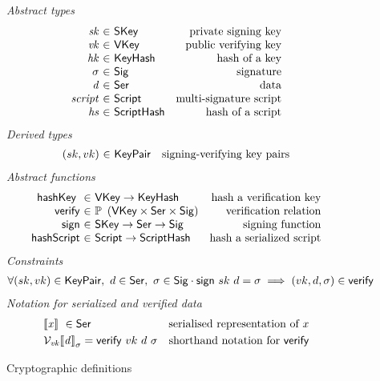 \begin{figure}[htb]
  \emph{Abstract types}
  \begin{equation*}
    \begin{array}{r@{~\in~}lr}
      \var{sk} & \SKey & \text{private signing key}\\
      \var{vk} & \VKey & \text{public verifying key}\\
      \var{hk} & \KeyHash & \text{hash of a key}\\
      \sigma & \Sig  & \text{signature}\\
      \var{d} & \Ser  & \text{data}\\
      \var{script} & \Script & \text{multi-signature script} \\
      \var{hs} & \HashScr & \text{hash of a script}
    \end{array}
  \end{equation*}
  \emph{Derived types}
  \begin{equation*}
    \begin{array}{r@{~\in~}lr}
      (sk, vk) & \KeyPair & \text{signing-verifying key pairs}
    \end{array}
  \end{equation*}
  \emph{Abstract functions}
  \begin{equation*}
    \begin{array}{r@{~\in~}lr}
      \hashKey{} & \VKey \to \KeyHash
                 & \text{hash a verification key} \\
      \fun{verify} & \powerset{\left(\VKey \times \Ser \times \Sig\right)}
                   & \text{verification relation}\\
      \fun{sign} & \SKey \to \Ser \to \Sig
                 & \text{signing function}\\
      \fun{hashScript} & \Script \to \HashScr & \text{hash a serialized script}
    \end{array}
  \end{equation*}
  \emph{Constraints}
  \begin{align*}
    & \forall (sk, vk) \in \mathsf{KeyPair},~ d \in \mathsf{Ser},~ \sigma \in \mathsf{Sig} \cdot
    \mathsf{sign} ~ sk ~ d = \sigma \implies (vk, d, \sigma) \in \mathsf{verify}
  \end{align*}
  \emph{Notation for serialized and verified data}
  \begin{align*}
    & \llbracket \mathit{x} \rrbracket ~\in \mathsf{Ser} & \text{serialised representation of } x\\
    & \mathcal{V}_{\mathit{vk}}{\llbracket \mathit{d} \rrbracket}_{\sigma} = \mathsf{verify} ~ vk ~ d ~ \sigma
    & \text{shorthand notation for } \mathsf{verify}
  \end{align*}
  \caption{Cryptographic definitions}
  \label{fig:crypto-defs-shelley}
\end{figure}

